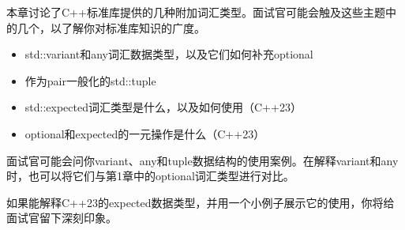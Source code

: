 
本章讨论了C++标准库提供的几种附加词汇类型。面试官可能会触及这些主题中的几个，以了解你对标准库知识的广度。


\begin{itemize}
\item
std::variant和any词汇数据类型，以及它们如何补充optional

\item
作为pair一般化的std::tuple

\item
std::expected词汇类型是什么，以及如何使用（C++23）

\item
optional和expected的一元操作是什么（C++23）
\end{itemize}


面试官可能会问你variant、any和tuple数据结构的使用案例。在解释variant和any时，也可以将它们与第1章中的optional词汇类型进行对比。

如果能解释C++23的expected数据类型，并用一个小例子展示它的使用，你将给面试官留下深刻印象。
